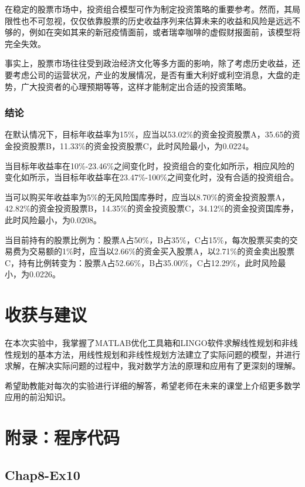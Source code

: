 \documentclass[12pt,a4paper]{article}
\begin{document}
在稳定的股票市场中，投资组合模型可作为制定投资策略的重要参考。然而，其局限性也不可忽视，仅仅依靠股票的历史收益序列来估算未来的收益和风险是远远不够的，例如在突如其来的新冠疫情面前，或者瑞幸咖啡的虚假财报面前，该模型将完全失效。

事实上，股票市场往往受到政治经济文化等多方面的影响，除了考虑历史收益，还要考虑公司的运营状况，产业的发展情况，是否有重大利好或利空消息，大盘的走势，广大投资者的心理预期等等，这样才能制定出合适的投资策略。

\subsubsection{结论}

在默认情况下，目标年收益率为15\%，应当以53.02\%的资金投资股票A，35.65的资金投资股票B，11.33\%的资金投资股票C，此时风险最小，为0.0224。

当目标年收益率在10\%-23.46\%之间变化时，投资组合的变化如所示，相应风险的变化如所示，当目标年收益率在23.47\%-100\%之间变化时，没有合适的投资组合。

当可以购买年收益率为5\%的无风险国库券时，应当以8.70\%的资金投资股票A，42.82\%的资金投资股票B，14.35\%的资金投资股票C，34.12\%的资金投资国库券，此时风险最小，为0.0208。

当目前持有的股票比例为：股票A占50\%，B占35\%，C占15\%，每次股票买卖的交易费为交易额的1\%时，应当以2.66\%的资金买入股票A，以2.71\%的资金卖出股票C，持有比例转变为：股票A占52.66\%，B占35.00\%，C占12.29\%，此时风险最小，为0.0226。

\section{收获与建议}

在本次实验中，我掌握了MATLAB优化工具箱和LINGO软件求解线性规划和非线性规划的基本方法，用线性规划和非线性规划方法建立了实际问题的模型，并进行求解，在解决实际问题的过程中，我对数学方法的原理和应用有了更深刻的理解。

希望助教能对每次的实验进行详细的解答，希望老师在未来的课堂上介绍更多数学应用的前沿知识。

\section{附录：程序代码}

\subsection{Chap8-Ex10}\label{sec:ex10_code}
\end{document}
